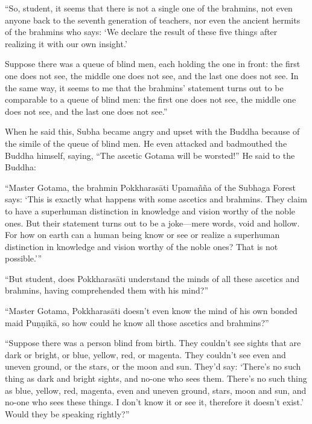 \documentclass[12pt,openany]{book}%
\begin{document}
“So, student, it seems that there is not a single one of the brahmins, not even anyone back to the seventh generation of teachers, nor even the ancient hermits of the brahmins who says: ‘We declare the result of these five things after realizing it with our own insight.’ 

Suppose there was a queue of blind men, each holding the one in front: the first one does not see, the middle one does not see, and the last one does not see. In the same way, it seems to me that the brahmins’ statement turns out to be comparable to a queue of blind men: the first one does not see, the middle one does not see, and the last one does not see.” 

When he said this, Subha became angry and upset with the Buddha because of the simile of the queue of blind men. He even attacked and badmouthed the Buddha himself, saying, “The ascetic Gotama will be worsted!” He said to the Buddha: 

“Master Gotama, the brahmin \textsanskrit{Pokkharasāti} \textsanskrit{Upamañña} of the Subhaga Forest says: ‘This is exactly what happens with some ascetics and brahmins. They claim to have a superhuman distinction in knowledge and vision worthy of the noble ones. But their statement turns out to be a joke—mere words, void and hollow. For how on earth can a human being know or see or realize a superhuman distinction in knowledge and vision worthy of the noble ones? That is not possible.’” 

“But student, does \textsanskrit{Pokkharasāti} understand the minds of all these ascetics and brahmins, having comprehended them with his mind?” 

“Master Gotama, \textsanskrit{Pokkharasāti} doesn’t even know the mind of his own bonded maid \textsanskrit{Puṇṇikā}, so how could he know all those ascetics and brahmins?” 

“Suppose there was a person blind from birth. They couldn’t see sights that are dark or bright, or blue, yellow, red, or magenta. They couldn’t see even and uneven ground, or the stars, or the moon and sun. They’d say: ‘There’s no such thing as dark and bright sights, and no-one who sees them. There’s no such thing as blue, yellow, red, magenta, even and uneven ground, stars, moon and sun, and no-one who sees these things. I don’t know it or see it, therefore it doesn’t exist.’ Would they be speaking rightly?” 
\end{document}
